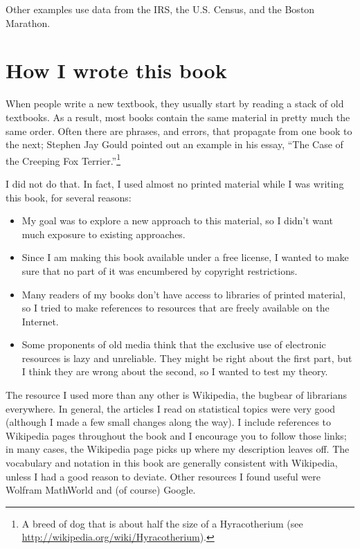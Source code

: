 \documentclass[12pt]{book}
\begin{document}
Other examples use data from the IRS, the U.S. Census, and
the Boston Marathon.


\section*{How I wrote this book}

When people write a new textbook, they usually start by
reading a stack of old textbooks.  As a result, most books
contain the same material in pretty much the same order.  Often there
are phrases, and errors, that propagate from one book to the next;
Stephen Jay Gould pointed out an example in his essay, ``The Case of
the Creeping Fox Terrier.''\footnote{A breed of dog that is about half
  the size of a Hyracotherium (see
  \url{http://wikipedia.org/wiki/Hyracotherium}).}

I did not do that.  In fact, I used almost no printed material while I
was writing this book, for several reasons:

\begin{itemize}

\item My goal was to explore a new approach to this material, so I didn't
want much exposure to existing approaches.

\item Since I am making this book available under a free license, I wanted
to make sure that no part of it was encumbered by copyright restrictions.

\item Many readers of my books don't have access to libraries of
printed material, so I tried to make references to resources that are
freely available on the Internet.

\item Some proponents of old media think that the exclusive
use of electronic resources is lazy and unreliable.  They might be right
about the first part, but I think they are wrong about the second, so
I wanted to test my theory.


\end{itemize}

The resource I used more than any other is Wikipedia, the bugbear
of librarians everywhere.  In general, the articles I read on
statistical topics were very good (although I made a few small changes
along the way).  I include references to Wikipedia pages throughout
the book and I encourage you to follow those links; in many cases, the
Wikipedia page picks up where my description leaves off.  The
vocabulary and notation in this book are generally consistent with
Wikipedia, unless I had a good reason to deviate.
Other resources I found useful were Wolfram MathWorld and (of course)
Google.
\end{document}
